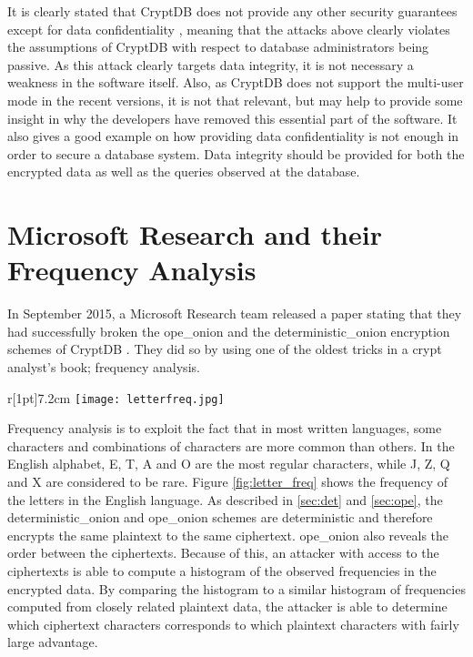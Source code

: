 It is clearly stated that CryptDB does not provide any other security guarantees except for data confidentiality \cite{CryptDB_Main_Paper}, meaning that the attacks above clearly violates the assumptions of CryptDB with respect to database administrators being passive. As this attack clearly targets data integrity, it is not necessary a weakness in the software itself. Also, as CryptDB does not support the multi-user mode in the recent versions, it is not that relevant, but may help to provide some insight in why the developers have removed this essential part of the software. It also gives a good example on how providing data confidentiality is not enough in order to secure a database system. Data integrity should be provided for both the encrypted data as well as the queries observed at the database.
 

\section{Microsoft Research and their Frequency Analysis}

In September 2015, a Microsoft Research team released a paper stating that they had successfully broken the \gls{ope_onion} and the \gls{deterministic_onion} encryption schemes of CryptDB \cite{microsoft_cryptdb}. They did so by using one of the oldest tricks in a crypt analyst's book; frequency analysis.

\begin{wrapfigure}[14]{r}[1pt]{7.2cm}
\centering
\texttt{[image: letterfreq.jpg]}
\caption{Bar chart of the letter frequency observed in the English language.}
\label{fig:letter_freq}
\end{wrapfigure}
Frequency analysis is to exploit the fact that in most written languages, some characters and combinations of characters are more common than others. In the English alphabet, E, T, A and O are the most regular characters, while J, Z, Q and X are considered to be rare. Figure \ref{fig:letter_freq} shows the frequency of the letters in the English language. As described in \ref{sec:det} and \ref{sec:ope}, the \gls{deterministic_onion} and \gls{ope_onion} schemes are deterministic and therefore encrypts the same plaintext to the same ciphertext. \gls{ope_onion} also reveals the order between the ciphertexts. Because of this, an attacker with access to the ciphertexts is able to compute a histogram of the observed frequencies in the encrypted data. By comparing the histogram to a similar histogram of frequencies computed from closely related plaintext data, the attacker is able to determine which ciphertext characters corresponds to which plaintext characters with fairly large advantage.


